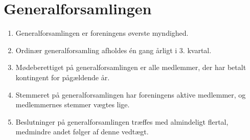 \documentclass[a4paper, 10pt]{article}
\newenvironment{stykenum}{
  \begin{enumerate}[%
    label=Stk.~\arabic*:, ref=\textsection~\theenumi~Stk.~\arabic*, start=1]
}{\end{enumerate}}
\begin{document}
\section{Generalforsamlingen}
\begin{stykenum}
    \item Generalforsamlingen er foreningens øverste myndighed.

    \item Ordinær generalforsamling afholdes én gang årligt i 3. kvartal.

    \item Mødeberettiget på generalforsamlingen er alle medlemmer, der har
        betalt kontingent for pågældende år.

    \item Stemmeret på generalforsamlingen har foreningens aktive medlemmer, og
        medlemmernes stemmer vægtes lige.

    \item Beslutninger på generalforsamlingen træffes med almindeligt flertal,
        medmindre andet følger af denne vedtægt.
\end{stykenum}
\end{document}
